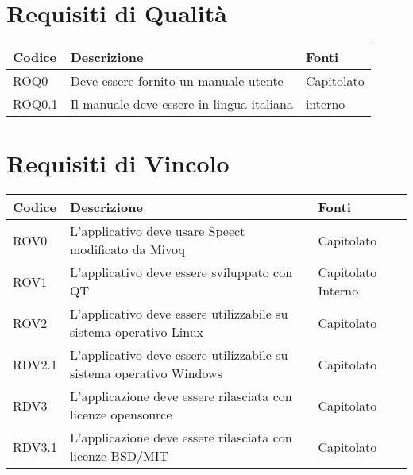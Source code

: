 \documentclass[../AnalisideiRequisiti.tex]{subfiles}
\begin{document}
	\section{Requisiti di Qualità}
		\begin{longtable}{| p{3cm} | p{6cm} | p{3cm} |}
			\hline
			\textbf{Codice} & \textbf{Descrizione} & \textbf{Fonti}\\
			\hline
			\endhead
				
			
			\newline ROQ0&
		\newline Deve essere fornito un manuale utente&
		\newline Capitolato
		\\[1em]
		\hline
			\newline ROQ0.1&
			\newline Il manuale deve essere in lingua italiana&
			\newline interno
			\\[1em]
			\hline
	\end{longtable}

	\section{Requisiti di Vincolo}
		\begin{longtable}{| p{3cm} | p{6cm} | p{3cm} |}
	\hline
	\textbf{Codice} & \textbf{Descrizione} & \textbf{Fonti}\\
	\hline
	\endhead
				\newline ROV0&
			\newline 
			L'applicativo deve usare Speect modificato da Mivoq &
			\newline Capitolato
			\\[1em]
			\hline	
			\newline 
			ROV1&
			\newline 
			L'applicativo deve essere sviluppato con QT &
			\newline Capitolato
			\newline Interno
			\\[1em]
			\hline
			\newline 
			ROV2&
			\newline 
			L'applicativo deve essere utilizzabile su sistema operativo Linux&
			\newline Capitolato
			\\[1em]
			\hline
			\newline
			RDV2.1&
			\newline 
			L'applicativo deve essere utilizzabile su sistema operativo Windows&
			\newline Capitolato
			\\[1em]
			\hline
			\newline
			RDV3&
			\newline 
			L'applicazione deve essere rilasciata con licenze opensource&
			\newline Capitolato
			\\[1em]
			\hline	
			RDV3.1&
			\newline 
			L'applicazione deve essere rilasciata con licenze BSD/MIT &
			\newline Capitolato
			\\[1em]
			\hline
	\end{longtable}
\end{document}
